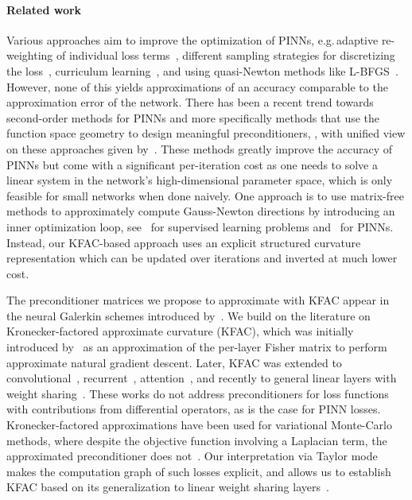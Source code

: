 \paragraph{Related work}
Various approaches aim to improve the optimization of PINNs, e.g.\,adaptive re-weighting of individual loss terms~\citep{wang2021understanding,van2022optimally,wang2022and}, different sampling strategies for discretizing the loss~\citep{lu2021deepxde, nabian2021efficient, daw2022rethinking,zapf2022investigating, wang2022respecting, wu2023comprehensive}, curriculum learning~\citep{krishnapriyan2021characterizing, wang2022respecting}, and using quasi-Newton methods like L-BFGS~\citep{markidis2021old}.
However, none of this yields approximations of an accuracy comparable to the approximation error of the network.
There has been a recent trend towards second-order methods for PINNs and more specifically methods that use the function space geometry to design meaningful preconditioners, \cite[see][]{zeng2022competitive, muller2023achieving, de2023operator, liu2024preconditioning, jnini2024gauss,chen2024teng, zampini2024petscml}, with unified view on these approaches given by~\citet{muller2024optimization}.
These methods greatly improve the accuracy of PINNs but come with a significant per-iteration cost as one needs to solve a linear system in the network's high-dimensional parameter space, which is only feasible for small networks when done naively.
One approach is to use matrix-free methods to approximately compute Gauss-Newton directions by introducing an inner optimization loop, see~\cite{schraudolph2002fast,martens2010deep} for supervised learning problems and~\cite{zeng2022competitive,bonfanti2024challenges, jnini2024gauss,zampini2024petscml} for PINNs.
Instead, our KFAC-based approach uses an explicit structured curvature representation which can be updated over iterations and inverted at much lower cost.

The preconditioner matrices we propose to approximate with KFAC appear in the neural Galerkin schemes introduced by~\citet{bruna2024neural}.
We build on the literature on Kronecker-factored approximate curvature (KFAC), which was initially introduced by~\citet{heskes2000natural,martens2010deep} as an approximation of the per-layer Fisher matrix to perform approximate natural gradient descent.
Later, KFAC was extended to convolutional~\citep{grosse2016kroneckerfactored}, recurrent~\citep{martens2018kroneckerfactored}, attention~\citep{zhang2019algorithmic,pauloski2021kaisa,osawa2023pipefisher,grosse2023studying}, and recently to general linear layers with weight sharing~\cite{eschenhagen2023kroneckerfactored}.
These works do not address preconditioners for loss functions with contributions from differential operators, as is the case for PINN losses.
Kronecker-factored approximations have been used for variational Monte-Carlo methods, where despite the objective function involving a Laplacian term, the approximated preconditioner does not~\citep{pfau2020ab,drissi2024second}.
Our interpretation via Taylor mode makes the computation graph of such losses explicit, and allows us to establish KFAC based on its generalization to linear weight sharing layers~\cite{eschenhagen2023kroneckerfactored}.

